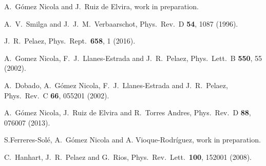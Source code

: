 \documentclass{PoS}
\begin{document}
\begin{thebibliography}{99}
 
 A.~G\'omez Nicola and J.~Ruiz de Elvira, work in preparation.  
 
  A.~V.~Smilga and J.~J.~M.~Verbaarschot,
  Phys.\ Rev.\  D {\bf 54}, 1087 (1996).

  J.~R.~Pelaez,
  Phys.\ Rept.\  {\bf 658}, 1 (2016).

  A.~Gomez Nicola, F.~J.~Llanes-Estrada and J.~R.~Pelaez,
  Phys.\ Lett.\ B \textbf{550}, 55 (2002).
  
  A.~Dobado, A.~G\'omez Nicola, F.~J.~Llanes-Estrada and J.~R.~Pelaez,
  Phys.\ Rev.\ C \textbf{66}, 055201 (2002).

  A.~G\'omez Nicola, J.~Ruiz de Elvira and R.~Torres Andres,
  Phys.\ Rev.\ D \textbf{88}, 076007 (2013).


 S.Ferreres-Sol\'e, A.~G\'omez Nicola and A. Vioque-Rodr\'iguez, work in preparation.  

  C.~Hanhart, J.~R.~Pelaez and G.~Rios,
  Phys.\ Rev.\ Lett.\  {\bf 100}, 152001 (2008).
 
 
\end{thebibliography}
\end{document}
